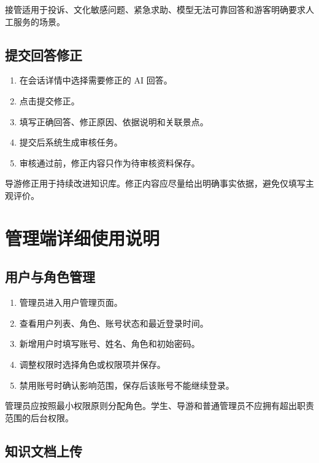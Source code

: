 接管适用于投诉、文化敏感问题、紧急求助、模型无法可靠回答和游客明确要求人工服务的场景。


\subsection{提交回答修正}

\begin{enumerate}[leftmargin=2em]
  \item 在会话详情中选择需要修正的 AI 回答。
  \item 点击提交修正。
  \item 填写正确回答、修正原因、依据说明和关联景点。
  \item 提交后系统生成审核任务。
  \item 审核通过前，修正内容只作为待审核资料保存。
\end{enumerate}

导游修正用于持续改进知识库。修正内容应尽量给出明确事实依据，避免仅填写主观评价。


\section{管理端详细使用说明}

\subsection{用户与角色管理}

\begin{enumerate}[leftmargin=2em]
  \item 管理员进入用户管理页面。
  \item 查看用户列表、角色、账号状态和最近登录时间。
  \item 新增用户时填写账号、姓名、角色和初始密码。
  \item 调整权限时选择角色或权限项并保存。
  \item 禁用账号时确认影响范围，保存后该账号不能继续登录。
\end{enumerate}

管理员应按照最小权限原则分配角色。学生、导游和普通管理员不应拥有超出职责范围的后台权限。


\subsection{知识文档上传}

